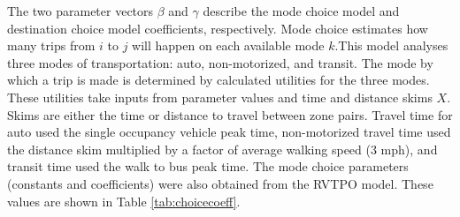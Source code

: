 \documentclass[fancy, masters, twoside]{byuthesis}
\begin{document}
The two parameter vectors \(\beta\) and \(\gamma\) describe the mode choice model and destination choice model coefficients, respectively. Mode choice estimates how many trips from \(i\) to \(j\) will happen on each available mode \(k\).This model analyses three modes of transportation: auto, non-motorized, and transit. The mode by which a trip is made is determined by calculated utilities for the three modes. These utilities take inputs from parameter values and time and distance skims \(X\). Skims are either the time or distance to travel between zone pairs. Travel time for auto used the single occupancy vehicle peak time, non-motorized travel time used the distance skim multiplied by a factor of average walking speed (3 mph), and transit time used the walk to bus peak time. The mode choice parameters (constants and coefficients) were also obtained from the RVTPO model. These values are shown in Table \ref{tab:choicecoeff}.
\end{document}
